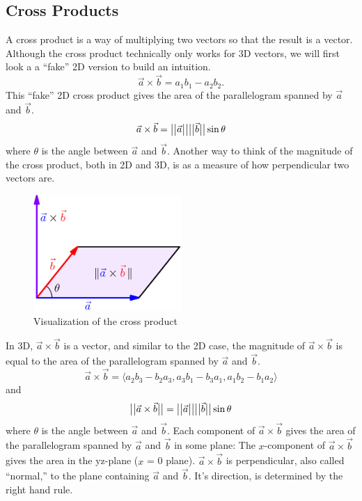 \subsection{Cross Products}
\noindent
A cross product is a way of multiplying two vectors so that the result is a vector.
Although the cross product technically only works for 3D vectors, we will first look a a ``fake'' 2D version to build an intuition.
\begin{equation*}
	\vec{a}\times\vec{b} = a_1b_1-a_2b_2.
\end{equation*}
This ``fake'' 2D cross product gives the area of the parallelogram spanned by $\vec{a}$ and $\vec{b}$.
\begin{equation*}
	\vec{a}\times\vec{b} = \big\lvert \big\lvert \vec{a} \big\rvert \big\rvert\big\lvert \big\lvert \vec{b} \big\rvert \big\rvert\sin{\theta}
\end{equation*}
where $\theta$ is the angle between $\vec{a}$ and $\vec{b}$.
Another way to think of the magnitude of the cross product, both in 2D and 3D, is as a measure of how perpendicular two vectors are.

\begin{figure}[H]
	\centering
	\includegraphics[width=0.5\textwidth]{../common/vectorsMatrices/CrossProduct.png}
	\caption{Visualization of the cross product}
\end{figure}

\noindent
In 3D, $\vec{a}\times\vec{b}$ is a vector, and similar to the 2D case, the magnitude of $\vec{a}\times\vec{b}$ is equal to the area of the parallelogram spanned by $\vec{a}$ and $\vec{b}$.
\begin{equation*}
	\vec{a}\times\vec{b} = \langle a_2b_3-b_2a_3,a_3b_1-b_3a_1,a_1b_2-b_1a_2 \rangle
\end{equation*}
and
\begin{equation*}
	\big\lvert \big\lvert \vec{a}\times\vec{b} \big\rvert \big\rvert=\big\lvert \big\lvert \vec{a} \big\rvert \big\rvert\big\lvert \big\lvert \vec{b} \big\rvert \big\rvert\sin{\theta}
\end{equation*}
where $\theta$ is the angle between $\vec{a}$ and $\vec{b}$.
Each component of $\vec{a}\times\vec{b}$ gives the area of the parallelogram spanned by $\vec{a}$ and $\vec{b}$ in some plane:
The $x$-component of $\vec{a}\times\vec{b}$ gives the area in the yz-plane ($x$ = 0 plane).
$\vec{a}\times\vec{b}$ is perpendicular, also called ``normal,'' to the plane containing $\vec{a}$ and $\vec{b}$. It's direction, is determined by the right hand rule.\\

